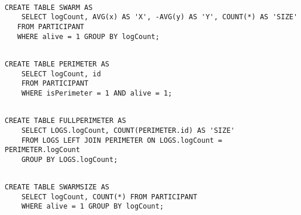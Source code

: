 \begin{lstlisting}[label={code:SWARM}]  % Start your code-block

CREATE TABLE SWARM AS 
	SELECT logCount, AVG(x) AS 'X', -AVG(y) AS 'Y', COUNT(*) AS 'SIZE' 
   FROM PARTICIPANT 
   WHERE alive = 1 GROUP BY logCount;
\end{lstlisting}

\begin{lstlisting}[label={code:PERIMETER}]  % Start your code-block

CREATE TABLE PERIMETER AS 
	SELECT logCount, id 
	FROM PARTICIPANT 
	WHERE isPerimeter = 1 AND alive = 1;

\end{lstlisting}

\begin{lstlisting}[label={code:FULLPERIMETER}]  % Start your code-block

CREATE TABLE FULLPERIMETER AS 
	SELECT LOGS.logCount, COUNT(PERIMETER.id) AS 'SIZE' 
	FROM LOGS LEFT JOIN PERIMETER ON LOGS.logCount = PERIMETER.logCount 
	GROUP BY LOGS.logCount;
\end{lstlisting}

\begin{lstlisting}[label={code:SWARMSIZE}]  % Start your code-block

CREATE TABLE SWARMSIZE AS 
	SELECT logCount, COUNT(*) FROM PARTICIPANT 
	WHERE alive = 1 GROUP BY logCount;

\end{lstlisting}

